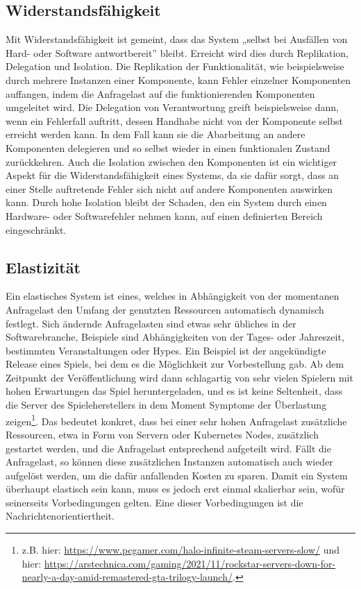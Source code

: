 \subsection{Widerstandsfähigkeit}
Mit Widerstandsfähigkeit ist gemeint, dass das System „selbst bei Ausfällen von Hard- oder Software antwortbereit” \cite{ReactiveManifesto} bleibt. Erreicht wird dies durch Replikation, Delegation und Isolation. Die Replikation der Funktionalität, wie beispielsweise durch mehrere Instanzen einer Komponente, kann Fehler einzelner Komponenten auffangen, indem die Anfragelast auf die funktionierenden Komponenten umgeleitet wird. Die Delegation von Verantwortung greift beispielsweise dann, wenn ein Fehlerfall auftritt, dessen Handhabe nicht von der Komponente selbst erreicht werden kann. In dem Fall kann sie die Abarbeitung an andere Komponenten delegieren und so selbst wieder in einen funktionalen Zustand zurückkehren. Auch die Isolation zwischen den Komponenten ist ein wichtiger Aspekt für die Widerstandsfähigkeit eines Systems, da sie dafür sorgt, dass an einer Stelle auftretende Fehler sich nicht auf andere Komponenten auswirken kann. Durch hohe Isolation bleibt der Schaden, den ein System durch einen Hardware- oder Softwarefehler nehmen kann, auf einen definierten Bereich eingeschränkt.

\subsection{Elastizität}
Ein elastisches System ist eines, welches in Abhängigkeit von der momentanen Anfragelast den Umfang der genutzten Ressourcen automatisch dynamisch festlegt. Sich ändernde Anfragelasten sind etwas sehr übliches in der Softwarebranche, Beispiele sind Abhängigkeiten von der Tages- oder Jahreszeit, bestimmten Veranstaltungen oder Hypes. Ein Beispiel ist der angekündigte Release eines Spiels, bei dem es die Möglichkeit zur Vorbestellung gab. Ab dem Zeitpunkt der Veröffentlichung wird dann schlagartig von sehr vielen Spielern mit hohen Erwartungen das Spiel heruntergeladen, und es ist keine Seltenheit, dass die Server des Spieleherstellers in dem Moment Symptome der Überlastung zeigen\footnote{z.B. hier: \url{https://www.pcgamer.com/halo-infinite-steam-servers-slow/} und hier: \url{https://arstechnica.com/gaming/2021/11/rockstar-servers-down-for-nearly-a-day-amid-remastered-gta-trilogy-launch/}.}. Das bedeutet konkret, dass bei einer sehr hohen Anfragelast zusätzliche Ressourcen, etwa in Form von Servern oder Kubernetes Nodes, zusätzlich gestartet werden, und die Anfragelast entsprechend aufgeteilt wird. Fällt die Anfragelast, so können diese zusätzlichen Instanzen automatisch auch wieder aufgelöst werden, um die dafür anfallenden Kosten zu sparen. Damit ein System überhaupt elastisch sein kann, muss es jedoch erst einmal skalierbar sein, wofür seinerseits Vorbedingungen gelten. Eine dieser Vorbedingungen ist die Nachrichtenorientiertheit.


